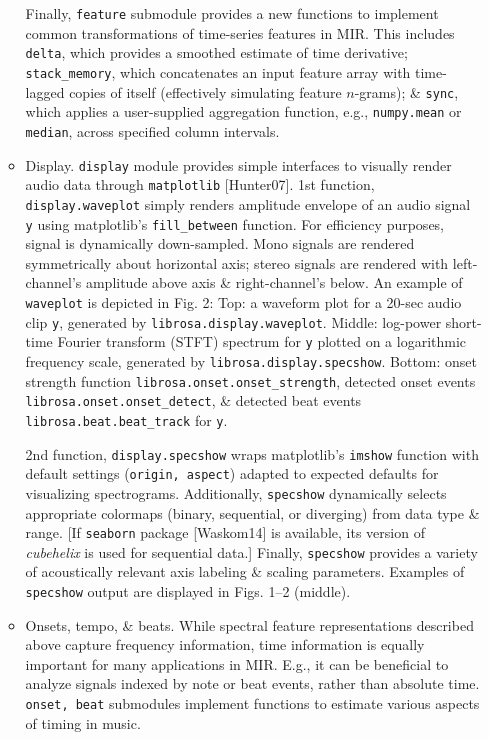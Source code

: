 \documentclass{article}
\begin{document}
\begin{itemize}
\begin{itemize}
		Finally, {\tt feature} submodule provides a new functions to implement common transformations of time-series features in MIR. This includes {\tt delta}, which provides a smoothed estimate of time derivative; \verb|stack_memory|, which concatenates an input feature array with time-lagged copies of itself (effectively simulating feature $n$-grams); \& {\tt sync}, which applies a user-supplied aggregation function, e.g., {\tt numpy.mean} or {\tt median}, across specified column intervals.
		\item {\sf Display.} {\tt display} module provides simple interfaces to visually render audio data through {\tt matplotlib} [Hunter07]. 1st function, {\tt display.waveplot} simply renders amplitude envelope of an audio signal {\tt y} using matplotlib's \verb|fill_between| function. For efficiency purposes, signal is dynamically down-sampled. Mono signals are rendered symmetrically about horizontal axis; stereo signals are rendered with left-channel's amplitude above axis \& right-channel's below. An example of {\tt waveplot} is depicted in {\sf Fig. 2: Top: a waveform plot for a 20-sec audio clip {\tt y}, generated by {\tt librosa.display.waveplot}. Middle: log-power short-time Fourier transform (STFT) spectrum for {\tt y} plotted on a logarithmic frequency scale, generated by {\tt librosa.display.specshow}. Bottom: onset strength function \verb|librosa.onset.onset_strength|, detected onset events \verb|librosa.onset.onset_detect|, \& detected beat events \verb|librosa.beat.beat_track| for {\tt y}.}
		
		2nd function, {\tt display.specshow} wraps matplotlib's {\tt imshow} function with default settings ({\tt origin, aspect}) adapted to expected defaults for visualizing spectrograms. Additionally, {\tt specshow} dynamically selects appropriate colormaps (binary, sequential, or diverging) from data type \& range. [If {\tt seaborn} package [Waskom14] is available, its version of {\it cubehelix} is used for sequential data.] Finally, {\tt specshow} provides a variety of acoustically relevant axis labeling \& scaling parameters. Examples of {\tt specshow} output are displayed in {\sf Figs. 1--2 (middle)}.
		\item {\sf Onsets, tempo, \& beats.} While spectral feature representations described above capture frequency information, time information is equally important for many applications in MIR. E.g., it can be beneficial to analyze signals indexed by note or beat events, rather than absolute time. {\tt onset, beat} submodules implement functions to estimate various aspects of timing in music.
		

\end{itemize}
\end{itemize}
\end{document}
